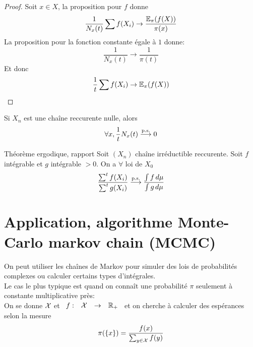 \documentclass[]{report}
\begin{document}
    \begin{proof}
        Soit $x\in X$, la proposition pour $f$ donne
        \[\frac{1}{N_x(t)}\sum f(X_i)\to\frac{\mathbb{E}_{\pi}(f(X))}{\pi(x)}\]
        La proposition pour la fonction constante égale à $1$ donne:
        \[\frac{1}{N_x(t)}\to \frac{1}{\pi(t)}\]
        Et donc
        \[\frac{1}{t}\sum f(X_i)\to \mathbb{E}_\pi (f(X))\]
    \end{proof}

    \begin{cor}{}{}
        Si $X_n$ est une chaîne reccurente nulle, alors
        \[\forall x,\frac{1}{t}N_x(t)\overset{\text{p.s.}}{\longrightarrow} 0\]
    \end{cor}

    \begin{cor}{Théorème ergodique, rapport}{}
        Soit $(X_n)$ chaîne irréductible reccurente. Soit $f$ intégrable et $g$ intégrable $>0$. On a $\forall$ loi de $X_0$
        \[\frac{\sum^t f(X_i)}{\sum^t g(X_i)}\overset{\text{p.s.}}{\longrightarrow} \frac{\int f\, d\mu}{\int g\, d\mu}\]
    \end{cor}

    \section{Application, algorithme Monte-Carlo markov chain (MCMC)}

    On peut utiliser les chaînes de Markov pour simuler des lois de probabilités complexes ou calculer certains types d'intégrales.\\
    Le cas le plus typique est quand on connaît une probabilité $\pi$ seulement à constante multiplicative près:\\
    On se donne $\mathcal{X}$ et $\begin{array}{ccccc} f : & \mathcal{X} & \to & \mathbb{R}_+ \end{array}$ et on cherche à calculer des espérances selon la mesure
    \[\pi(\{x\})=\dfrac{f(x)}{\sum_{y\in \mathcal{X}}f(y)}\]
\end{document}
